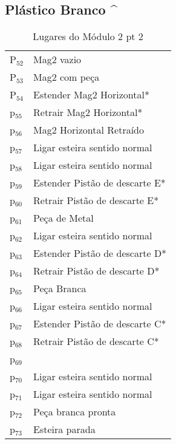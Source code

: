 \documentclass[11pt]{article}
\begin{document}
\subsection{Plástico Branco \^{}}
\label{sec-1-3}
\begin{table}[htb]
\caption{Lugares do Módulo 2 pt 2}
\centering
\begin{tabular}{ll}
P$_{\text{52}}$ & Mag2 vazio\\
P$_{\text{53}}$ & Mag2 com peça\\
P$_{\text{54}}$ & Estender Mag2 Horizontal*\\
p$_{\text{55}}$ & Retrair Mag2 Horizontal*\\
p$_{\text{56}}$ & Mag2 Horizontal Retraído\\
p$_{\text{57}}$ & Ligar esteira sentido normal\\
p$_{\text{58}}$ & Ligar esteira sentido normal\\
p$_{\text{59}}$ & Estender Pistão de descarte E*\\
p$_{\text{60}}$ & Retrair Pistão de descarte E*\\
p$_{\text{61}}$ & Peça de Metal\\
p$_{\text{62}}$ & Ligar esteira sentido normal\\
p$_{\text{63}}$ & Estender Pistão de descarte D*\\
p$_{\text{64}}$ & Retrair Pistão de descarte D*\\
p$_{\text{65}}$ & Peça Branca\\
p$_{\text{66}}$ & Ligar esteira sentido normal\\
p$_{\text{67}}$ & Estender Pistão de descarte C*\\
p$_{\text{68}}$ & Retrair Pistão de descarte C*\\
p$_{\text{69}}$ & \\
p$_{\text{70}}$ & Ligar esteira sentido normal\\
p$_{\text{71}}$ & Ligar esteira sentido normal\\
p$_{\text{72}}$ & Peça branca pronta\\
p$_{\text{73}}$ & Esteira parada\\
\end{tabular}
\end{table}
\end{document}
